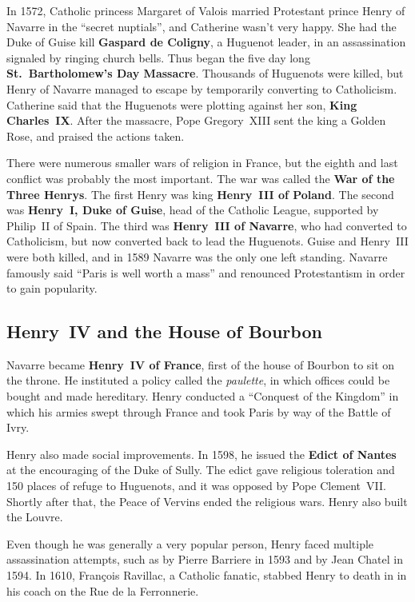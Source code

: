 In 1572, Catholic princess Margaret of Valois married
Protestant prince Henry of Navarre in the ``secret nuptials'', and Catherine wasn't very happy.
She had the Duke of Guise kill \textbf{Gaspard de Coligny}, a Huguenot leader,
in an assassination signaled by ringing church bells.
Thus began the five day long \textbf{St.\ Bartholomew's Day Massacre}.
Thousands of Huguenots were killed,
but Henry of Navarre managed to escape by temporarily converting to Catholicism.
Catherine said that the Huguenots were plotting against her son, \textbf{King Charles~IX}\@.
After the massacre, Pope Gregory~XIII sent the king a Golden Rose, and praised the actions taken.

There were numerous smaller wars of religion in France,
but the eighth and last conflict was probably the most important.
The war was called the \textbf{War of the Three Henrys}.
The first Henry was king \textbf{Henry~III of Poland}.
The second was \textbf{Henry~I, Duke of Guise}, head of the Catholic League,
supported by Philip~II of Spain.
The third was \textbf{Henry~III of Navarre}, who had converted to Catholicism,
but now converted back to lead the Huguenots.
Guise and Henry~III were both killed, and in 1589 Navarre was the only one left standing.
Navarre famously said ``Paris is well worth a mass''
and renounced Protestantism in order to gain popularity.

\subsection*{Henry~IV and the House of Bourbon}

Navarre became \textbf{Henry~IV of France}, first of the house of Bourbon to sit on the throne.
He instituted a policy called the \textit{paulette},
in which offices could be bought and made hereditary.
Henry conducted a ``Conquest of the Kingdom''
in which his armies swept through France and took Paris
by way of the Battle of Ivry.

Henry also made social improvements.
In 1598, he issued the \textbf{Edict of Nantes} at the encouraging of the Duke of Sully.
The edict gave religious toleration and 150 places of refuge to Huguenots,
and it was opposed by Pope Clement~VII\@.
Shortly after that, the Peace of Vervins ended the religious wars.
Henry also built the Louvre.

Even though he was generally a very popular person, Henry faced multiple assassination attempts,
such as by Pierre Barriere in 1593 and by Jean Chatel in 1594.
In 1610, Fran\c{c}ois Ravillac, a Catholic fanatic,
stabbed Henry to death in in his coach on the Rue de la Ferronnerie.

